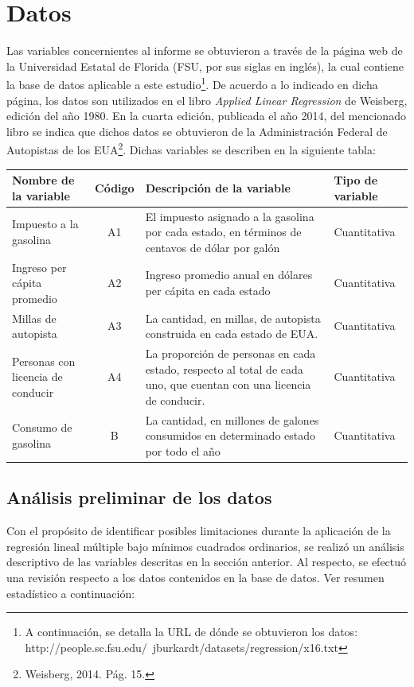 \documentclass[a4paper,10pt]{article}\usepackage[]{graphicx}\usepackage[]{color}
\begin{document}
\section{Datos}
	Las variables concernientes al informe se obtuvieron a través de la página web de la Universidad Estatal de Florida (FSU, por sus siglas en inglés), la cual contiene la base de datos aplicable a este estudio\footnote{A continuación, se detalla la URL de dónde se obtuvieron los datos: http://people.sc.fsu.edu/~jburkardt/datasets/regression/x16.txt}. De acuerdo a lo indicado en dicha página, los datos son utilizados en el libro \emph{Applied Linear Regression} de Weisberg, edición del año 1980. En la cuarta edición, publicada el año 2014, del mencionado libro se indica que dichos datos se obtuvieron de la Administración Federal de Autopistas de los EUA\footnote{Weisberg, 2014. Pág. 15.}. Dichas variables se describen en la siguiente tabla:
	
	\begin{center}
		\begin{tabular}{p{3.5cm}|c|p{3.5cm}|p{2.5cm}}
		Nombre de la variable&Código&Descripción de la variable&Tipo de variable\\
		\hline
		\hline
		Impuesto a la gasolina&A1&El impuesto asignado a la gasolina por cada estado, en términos de centavos de dólar por galón&Cuantitativa\\
		\hline
		Ingreso per cápita promedio&A2&Ingreso promedio anual en dólares per cápita en cada estado&Cuantitativa\\
		\hline
		Millas de autopista&A3&La cantidad, en millas, de autopista construida en cada estado de EUA.&Cuantitativa\\
		\hline
		Personas con licencia de conducir&A4&La proporción de personas en cada estado, respecto al total de cada uno, que cuentan con una licencia de conducir.&Cuantitativa\\
		\hline
		Consumo de gasolina&B&La cantidad, en millones de galones consumidos en determinado estado por todo el año&Cuantitativa
		\end{tabular}
	\end{center}

\subsection{Análisis preliminar de los datos}
  Con el propósito de identificar posibles limitaciones durante la aplicación de la regresión lineal múltiple bajo mínimos cuadrados ordinarios, se realizó un análisis descriptivo de las variables descritas en la sección anterior. Al respecto, se efectuó una revisión respecto a los datos contenidos en la base de datos. Ver resumen estadístico a continuación:
\end{document}
